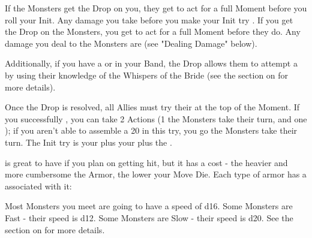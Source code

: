   If the Monsters get the Drop on you, they get to act for a full Moment before you roll your Init. Any damage you take before you make your Init try . If you get the Drop on the Monsters, you get to act for a full Moment before they do. Any damage you deal to the Monsters are  (see "Dealing Damage" below).

Additionally, if you have a  or  in your Band, the Drop allows them to attempt a  by using their knowledge of the Whispers of the Bride (see the section on  for more details).


    Once the Drop is resolved, all Allies must try their  at the top of the Moment. If you successfully \RO, you can take 2 Actions (1  the Monsters take their turn, and one ); if you aren't able to assemble a 20 in this \RO try, you go  the Monsters take their turn. The Init try is your \INT plus your  plus the .




\newpage

   \MD

   is great to have if you plan on getting hit, but it has a cost - the heavier and more cumbersome the Armor, the lower your Move Die. Each type of armor has a \MD associated with it:




  Most Monsters you meet are going to have a speed of d16. Some Monsters are Fast - their speed is d12.  Some Monsters are Slow - their speed is d20.  See the section on  for more details.



\cbreak

